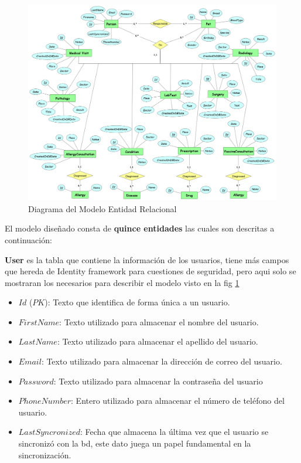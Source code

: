 \begin{figure}
	\centering
	\includegraphics[width = 15cm]{MainMatter/model.png}
	\caption{Diagrama del Modelo Entidad Relacional }
	\label{fig:model}
	
\end{figure}	
\newpage

El modelo diseñado consta de \textbf{quince entidades} las cuales son descritas a continuación:
\newline


\textbf{User} es la tabla que contiene la información  de los usuarios, tiene más campos que hereda de Identity framework para cuestiones de seguridad, pero aqui solo se mostraran los necesarios para describir el modelo visto en la  fig \ref{fig:model}

\begin{itemize}
	\item	$Id$ ($PK$): Texto que identifica de forma única a un usuario.
	\item	$FirstName$: Texto utilizado para almacenar el nombre del usuario.
	\item	$LastName$: Texto utilizado para almacenar el apellido del usuario.

	\item	$Email$: Texto utilizado para almacenar la dirección de correo del usuario.
	\item	$Password$: Texto utilizado para almacenar la contraseña del usuario
	\item	$PhoneNumber$: Entero utilizado para almacenar el número de teléfono del usuario.
	\item	$LastSyncronized$: Fecha que almacena la última vez que el usuario se sincronizó con la bd, este dato juega un papel fundamental en la sincronización.
	
	
\end{itemize}


